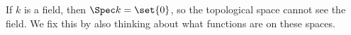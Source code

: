 If $k$ is a field, then $\Spec k = \set{0}$, so the topological space cannot
see the field. We fix this by also thinking about what functions are on
these spaces.
